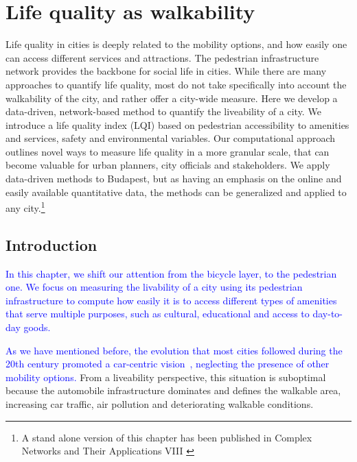 \chapter{Life quality as walkability}\label{ch:LQI}

Life quality in cities is deeply related to the mobility options, and how easily one can access different services and attractions. The pedestrian infrastructure network provides the backbone for social life in cities. While there are many approaches to quantify life quality, most do not take specifically into account the walkability of the city, and rather offer a city-wide measure. Here we develop a data-driven, network-based method to quantify the liveability of a city. We introduce a life quality index (LQI) based on pedestrian accessibility to amenities and services, safety and environmental variables. Our computational approach outlines novel ways to measure life quality in a more granular scale, that can become valuable for urban planners, city officials and stakeholders. We apply data-driven methods to Budapest, but as having an emphasis on the online and easily available quantitative data, the methods can be generalized and applied to any city.\footnote{A stand alone version of this chapter has been published in Complex Networks and Their Applications VIII \cite{natera2020walkability}}
\pagebreak

\section{Introduction}
\textcolor{blue}{In this chapter, we shift our attention from the bicycle layer, to the pedestrian one. We focus on measuring the livability of a city using its pedestrian infrastructure to compute how easily it is to access different types of amenities that serve multiple purposes, such as cultural, educational and access to day-to-day goods.}

\textcolor{blue}{As we have mentioned before, the evolution that most cities followed during the 20th century promoted a car-centric vision~\cite{Jacobs1961Death,Gossling2016Space,Szell2018Crowdsourced}, neglecting the presence of other mobility options.} From a liveability perspective, this situation is suboptimal because the automobile infrastructure dominates and defines the walkable area, increasing car traffic, air pollution and deteriorating walkable conditions.

